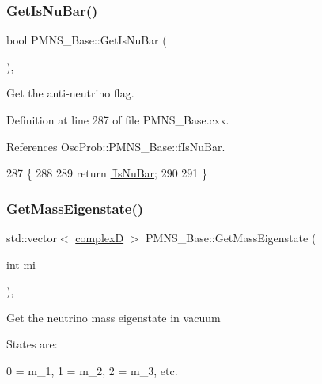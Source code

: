 \subsubsection{\texorpdfstring{Get\+Is\+Nu\+Bar()}{GetIsNuBar()}}
{\footnotesize\ttfamily bool P\+M\+N\+S\+\_\+\+Base\+::\+Get\+Is\+Nu\+Bar (\begin{DoxyParamCaption}{ }\end{DoxyParamCaption})\hspace{0.3cm}{\ttfamily [virtual]}, {\ttfamily [inherited]}}

Get the anti-\/neutrino flag. 

Definition at line 287 of file P\+M\+N\+S\+\_\+\+Base.\+cxx.



References Osc\+Prob\+::\+P\+M\+N\+S\+\_\+\+Base\+::f\+Is\+Nu\+Bar.


\begin{DoxyCode}
287                            \{
288 
289   \textcolor{keywordflow}{return} \hyperlink{classOscProb_1_1PMNS__Base_a0ebaeaefab36a3ff381c6293faedfdd6}{fIsNuBar};
290 
291 \}
\end{DoxyCode}
\mbox{\label{classOscProb_1_1PMNS__Base_a5092561dd8579d390c649eb60803ea98}} 
\subsubsection{\texorpdfstring{Get\+Mass\+Eigenstate()}{GetMassEigenstate()}}
{\footnotesize\ttfamily std\+::vector$<$ \hyperlink{EigenPoint_8h_a67ca8e107e20610c3fff78d5e726ece0}{complexD} $>$ P\+M\+N\+S\+\_\+\+Base\+::\+Get\+Mass\+Eigenstate (\begin{DoxyParamCaption}\item[{int}]{mi }\end{DoxyParamCaption})\hspace{0.3cm}{\ttfamily [virtual]}, {\ttfamily [inherited]}}

Get the neutrino mass eigenstate in vacuum

States are\+: 
\begin{DoxyPre}
  0 = m\_1, 1 = m\_2, 2 = m\_3, etc.
\end{DoxyPre}
 
